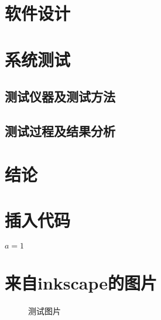\documentclass[pdfCover]{contestTemplate} %
\begin{document}
\section{软件设计}

\section{系统测试}

	\subsection{测试仪器及测试方法}

	\subsection{测试过程及结果分析}

\section{结论}


\section*{插入代码}
\begin{codebox}
  \li $a = 1$

\end{codebox}

\section*{来自inkscape的图片}
	\begin{figure}[H]
		\centering
		\def\svgwidth{0.6\linewidth}
		
		\caption{测试图片}
		\label{fig:_test}
	\end{figure}



\nocite{*}
\end{document}
